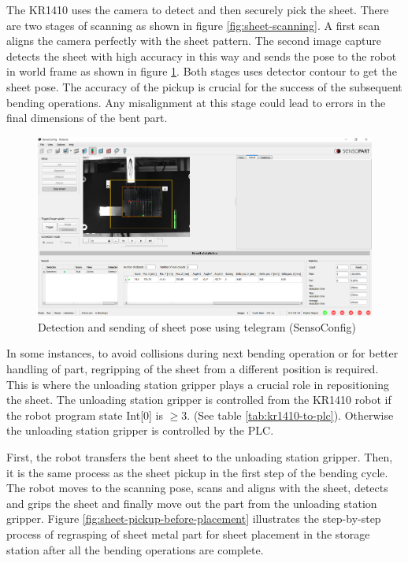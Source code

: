 The KR1410 uses the camera to detect and then securely pick the sheet. There are two stages of scanning as shown in figure \ref{fig:sheet-scanning}. A first scan aligns the camera perfectly with the sheet pattern. The second image capture detects the sheet with high accuracy in this way and sends the pose to the robot in world frame as shown in figure \ref{fig:sensoconfig-pattern}. Both stages uses detector contour to get the sheet pose.
The accuracy of the pickup is crucial for the success of the subsequent bending operations. Any misalignment at this stage could lead to errors in the final dimensions of the bent part.

\begin{figure}[h]
    \centering
    \includegraphics[width=\textwidth]{figures/sheet-pickup/sensoconfig.PNG}
    \caption{Detection and sending of sheet pose using telegram (SensoConfig)}
    \label{fig:sensoconfig-pattern}
\end{figure}

In some instances, to avoid collisions during next bending operation or for better handling of part, regripping of the sheet from a different position is required. This is where the unloading station gripper plays a crucial role in repositioning the sheet. The unloading station gripper is controlled from the KR1410 robot if the robot program state Int[0] is $\ge$3. (See table \ref{tab:kr1410-to-plc}). Otherwise the unloading station gripper is controlled by the PLC. 
\vspace{1\baselineskip}

First, the robot transfers the bent sheet to the unloading station gripper. Then, it is the same process as the sheet pickup in the first step of the bending cycle. The robot moves to the scanning pose, scans and aligns with the sheet, detects and grips the sheet and finally move out the part from the unloading station gripper.
Figure \ref{fig:sheet-pickup-before-placement} illustrates the step-by-step process of regrasping of sheet metal part for sheet placement in the storage station after all the bending operations are complete.


